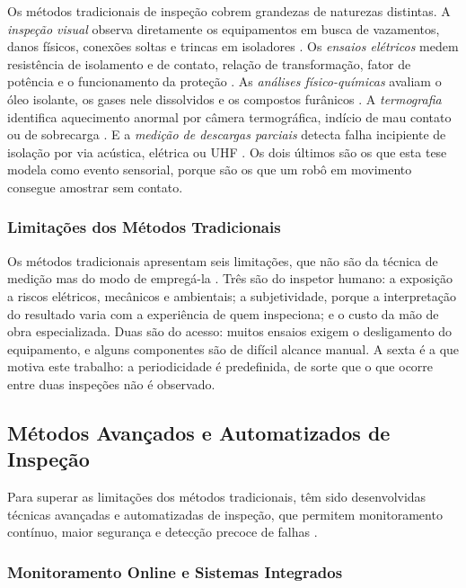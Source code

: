 Os métodos tradicionais de inspeção cobrem grandezas de naturezas distintas. A
\emph{inspeção visual} observa diretamente os equipamentos em busca de vazamentos, danos
físicos, conexões soltas e trincas em isoladores \cite{Inovarum2017}. Os \emph{ensaios
elétricos} medem resistência de isolamento e de contato, relação de transformação, fator
de potência e o funcionamento da proteção \cite{Conprove2019}. As \emph{análises
físico-químicas} avaliam o óleo isolante, os gases nele dissolvidos e os compostos
furânicos \cite{Inovarum2017}. A \emph{termografia} identifica aquecimento anormal por
câmera termográfica, indício de mau contato ou de sobrecarga \cite{Pixforce2024}. E a
\emph{medição de descargas parciais} detecta falha incipiente de isolação por via
acústica, elétrica ou UHF \cite{Frontin2013}. Os dois últimos são os que esta tese modela
como evento sensorial, porque são os que um robô em movimento consegue amostrar sem
contato.

\subsubsection{Limitações dos Métodos Tradicionais}

Os métodos tradicionais apresentam seis limitações, que não são da técnica de medição mas
do modo de empregá-la \cite{GlobalGrowthInsights2024}. Três são do inspetor humano: a
exposição a riscos elétricos, mecânicos e ambientais; a subjetividade, porque a
interpretação do resultado varia com a experiência de quem inspeciona; e o custo da mão
de obra especializada. Duas são do acesso: muitos ensaios exigem o desligamento do
equipamento, e alguns componentes são de difícil alcance manual. A sexta é a que motiva
este trabalho: a periodicidade é predefinida, de sorte que o que ocorre entre duas
inspeções não é observado.

\subsection{Métodos Avançados e Automatizados de Inspeção}

Para superar as limitações dos métodos tradicionais, têm sido desenvolvidas técnicas avançadas e automatizadas de inspeção, que permitem monitoramento contínuo, maior segurança e detecção precoce de falhas \cite{Wei2024Advancements}.

\subsubsection{Monitoramento Online e Sistemas Integrados}

